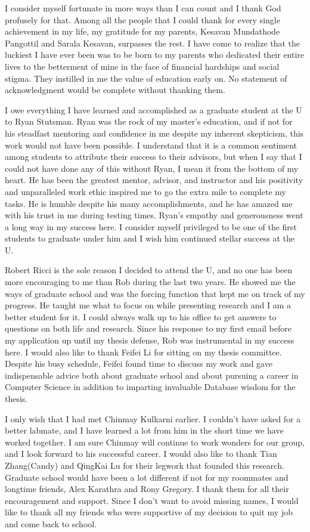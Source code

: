 I consider myself fortunate in more ways than I can count and I thank God profusely for that. 
Among all the people that I could thank for every single achievement in my life, my gratitude for my parents, Kesavan Mundathode Pangottil and Sarala Kesavan, surpasses the rest. 
I have come to realize that the luckiest I have ever been was to be born to my parents who dedicated their entire lives to the betterment of mine in the face of financial hardships and social stigma. 
They instilled in me the value of education early on. No statement of acknowledgment would be complete without thanking them.

I owe everything I have learned and accomplished as a graduate student at the U to Ryan Stutsman. 
Ryan was the rock of my master's education, and if not for his steadfast mentoring and confidence in me despite my inherent skepticism, this work would not have been possible. 
I understand that it is a common sentiment among students to attribute their success to their advisors, but when I say that I could not have done any of this without Ryan, I mean it from the bottom of my heart. 
He has been the greatest mentor, advisor, and instructor and his positivity and unparalleled work ethic inspired me to go the extra mile to complete my tasks. 
He is humble despite his many accomplishments, and he has amazed me with his trust in me during testing times. 
Ryan's empathy and generousness went a long way in my success here. 
I consider myself privileged to be one of the first students to graduate under him and I wish him continued stellar success at the U.

Robert Ricci is the sole reason I decided to attend the U, and no one has been more encouraging to me than Rob during the last two years. 
He showed me the ways of graduate school and was the forcing function that kept me on track of my progress. 
He taught me what to focus on while presenting research and I am a better student for it. 
I could always walk up to his office to get answers to questions on both life and research. 
Since his response to my first email before my application up until my thesis defense, Rob was instrumental in my success here. 
I would also like to thank Feifei Li for sitting on my thesis committee. Despite his busy schedule, Feifei found time to discuss my work and gave indispensable advice both about graduate school and about pursuing a career in Computer Science in addition to imparting invaluable Database wisdom for the thesis.

I only wish that I had met Chinmay Kulkarni earlier. 
I couldn't have asked for a better labmate, and I have learned a lot from him in the short time we have worked together. 
I am sure Chinmay will continue to work wonders for our group, and I look forward to his successful career. 
I would also like to thank Tian Zhang(Candy) and QingKai Lu for their legwork that founded this research. 
Graduate school would have been a lot different if not for my roommates and longtime friends, Alex Karathra and Rony Gregory. 
I thank them for all their encouragement and support. Since I don't want to avoid missing names, I would like to thank all my friends who were supportive of my decision to quit my job and come back to school.

